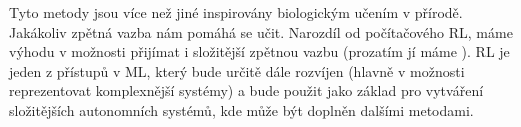 \documentclass{article}
\begin{document}
Tyto metody jsou více než jiné inspirovány biologickým učením v přírodě. Jakákoliv zpětná vazba nám pomáhá se učit. Narozdíl od počítačového RL, máme výhodu v možnosti přijímat i složitější zpětnou vazbu (prozatím jí máme ). RL je jeden z přístupů v ML, který bude určitě dále rozvíjen (hlavně v možnosti reprezentovat komplexnější systémy) a bude použit jako základ pro vytváření složitějších autonomních systémů, kde může být doplněn dalšími metodami.

  
  
\end{document}
